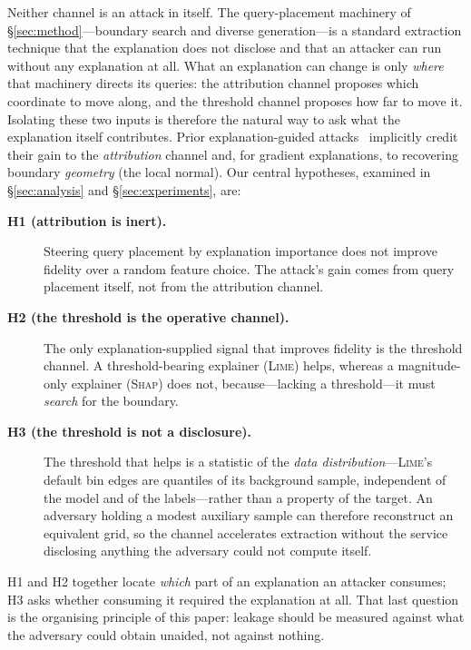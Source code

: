 \documentclass[sigconf,anonymous,review]{acmart}
\begin{document}
Neither channel is an attack in itself. The query-placement machinery of \S\ref{sec:method}---boundary
search and diverse generation---is a standard extraction technique that the explanation does not
disclose and that an attacker can run without any explanation at all. What an explanation can change is
only \emph{where} that machinery directs its queries: the attribution channel proposes which coordinate
to move along, and the threshold channel proposes how far to move it. Isolating these two inputs is
therefore the natural way to ask what the explanation itself contributes. Prior explanation-guided
attacks~\cite{oksuz2024autolycus,milli2019model} implicitly credit their gain to the
\emph{attribution} channel and, for gradient explanations, to recovering boundary \emph{geometry} (the
local normal). Our central hypotheses, examined
in \S\ref{sec:analysis} and \S\ref{sec:experiments}, are:
\begin{description}
  \item[\textbf{H1 (attribution is inert).}] Steering query placement by explanation
  importance does not improve fidelity over a random feature choice. The attack's gain
  comes from query placement itself, not from the attribution channel.
  \item[\textbf{H2 (the threshold is the operative channel).}] The only explanation-supplied
  signal that improves fidelity is the threshold channel. A threshold-bearing explainer
  (\textsc{Lime}) helps, whereas a magnitude-only explainer (\textsc{Shap}) does not,
  because---lacking a threshold---it must \emph{search} for the boundary.
  \item[\textbf{H3 (the threshold is not a disclosure).}] The threshold that helps is a
  statistic of the \emph{data distribution}---\textsc{Lime}'s default bin edges are quantiles
  of its background sample, independent of the model and of the labels---rather than a
  property of the target. An adversary holding a modest auxiliary sample can therefore
  reconstruct an equivalent grid, so the channel accelerates extraction without the service
  disclosing anything the adversary could not compute itself.
\end{description}
H1 and H2 together locate \emph{which} part of an explanation an attacker consumes; H3 asks
whether consuming it required the explanation at all. That last question is the organising
principle of this paper: leakage should be measured against what the adversary could obtain
unaided, not against nothing.
\end{document}
